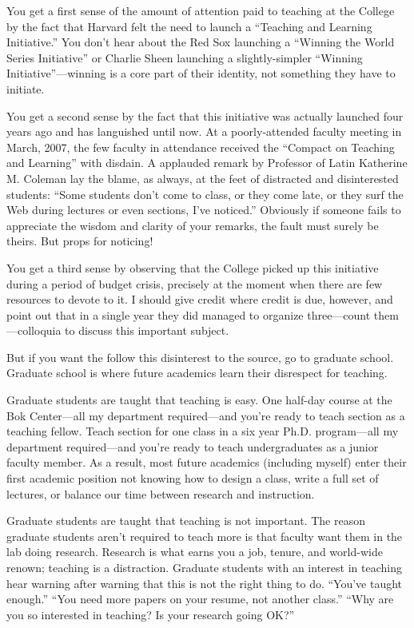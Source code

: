 
You get a first sense of the amount of attention paid to teaching at the
College by the fact that Harvard felt the need to launch a ``Teaching and
Learning Initiative.'' You don't hear about the Red Sox launching a ``Winning
the World Series Initiative'' or Charlie Sheen launching a slightly-simpler
``Winning Initiative''---winning is a core part of their identity, not
something they have to initiate.

You get a second sense by the fact that this initiative was actually launched
four years ago and has languished until now. At a poorly-attended faculty
meeting in March, 2007, the few faculty in attendance received the ``Compact
on Teaching and Learning'' with disdain. A applauded remark by Professor of
Latin Katherine M. Coleman lay the blame, as always, at the feet of
distracted and disinterested students: ``Some students don’t come to class,
or they come late, or they surf the Web during lectures or even sections,
I’ve noticed.'' Obviously if someone fails to appreciate the wisdom and
clarity of your remarks, the fault must surely be theirs. But props for
noticing!

You get a third sense by observing that the College picked up this initiative
during a period of budget crisis, precisely at the moment when there are few
resources to devote to it. I should give credit where credit is due, however,
and point out that in a single year they did managed to organize
three---count them---colloquia to discuss this important subject.

But if you want the follow this disinterest to the source, go to graduate
school. Graduate school is where future academics learn their disrespect for
teaching.

Graduate students are taught that teaching is easy. One half-day course at
the Bok Center---all my department required---and you're ready to teach
section as a teaching fellow. Teach section for one class in a six year Ph.D.
program---all my department required---and you're ready to teach
undergraduates as a junior faculty member. As a result, most future academics
(including myself) enter their first academic position not knowing how to
design a class, write a full set of lectures, or balance our time between
research and instruction.

Graduate students are taught that teaching is not important. The reason
graduate students aren't required to teach more is that faculty want them in
the lab doing research. Research is what earns you a job, tenure, and
world-wide renown; teaching is a distraction. Graduate students with an
interest in teaching hear warning after warning that this is not the right
thing to do. ``You've taught enough.'' ``You need more papers on your resume,
not another class.'' ``Why are you so interested in teaching? Is your
research going OK?''


